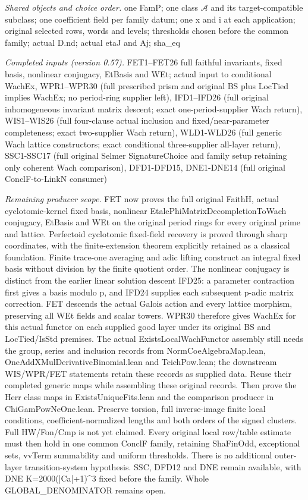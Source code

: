 \emph{Shared objects and choice order.} one FamP; one class $\mathcal A$ and its target-compatible subclass; one coefficient field per family datum; one x and i at each application; original selected rows, words and levels; thresholds chosen before the common family; actual D.nd; actual etaJ and Aj; sha\_\allowbreak eq

\emph{Completed inputs (version 0.57).} FET1–FET26 full faithful invariants, fixed basis, nonlinear conjugacy, EtBasis and WEt; actual input to conditional WachEx, WPR1–WPR30 (full prescribed prism and original BS plus LocTied implies WachEx; no period-ring supplier left), IFD1–IFD26 (full original inhomogeneous invariant matrix descent; exact one-period-supplier Wach return), WIS1–WIS26 (full four-clause actual inclusion and fixed/near-parameter completeness; exact two-supplier Wach return), WLD1-WLD26 (full generic Wach lattice constructors; exact conditional three-supplier all-layer return), SSC1-SSC17 (full original Selmer SignatureChoice and family setup retaining only coherent Wach comparison), DFD1-DFD15, DNE1-DNE14 (full original ConclF-to-LinkN consumer)

\emph{Remaining producer scope.} FET now proves the full original FaithH, actual cyclotomic-kernel fixed basis, nonlinear EtalePhiMatrixDecompletionToWach conjugacy, EtBasis and WEt on the original period rings for every original prime and lattice. Perfectoid cyclotomic fixed-field recovery is proved through sharp coordinates, with the finite-extension theorem explicitly retained as a classical foundation. Finite trace-one averaging and adic lifting construct an integral fixed basis without division by the finite quotient order. The nonlinear conjugacy is distinct from the earlier linear solution descent IFD25: a parameter contraction first gives a basis modulo p, and IFD24 supplies each subsequent p-adic matrix correction. FET descends the actual Galois action and every lattice morphism, preserving all WEt fields and scalar towers. WPR30 therefore gives WachEx for this actual functor on each supplied good layer under its original BS and LocTied/IsStd premises. The actual ExistsLocalWachFunctor assembly still needs the group, series and inclusion records from NormCoeAlgebraMap.lean, OneAddXMulDerivativeBinomial.lean and TeichPow.lean; the downstream WIS/WPR/FET statements retain these records as supplied data. Reuse their completed generic maps while assembling these original records. Then prove the Herr class maps in ExistsUniqueFits.lean and the comparison producer in ChiGamPowNeOne.lean. Preserve torsion, full inverse-image finite local conditions, coefficient-normalized lengths and both orders of the signed clusters. Full HW/Fon/Cmp is not yet claimed. Every original local row/table estimate must then hold in one common ConclF family, retaining ShaFinOdd, exceptional sets, vvTerm summability and uniform thresholds. There is no additional outer-layer transition-system hypothesis. SSC, DFD12 and DNE remain available, with DNE K=2000(|Ca|+1)\textasciicircum{}3 fixed before the family. Whole GLOBAL\_\allowbreak DENOMINATOR remains open.

